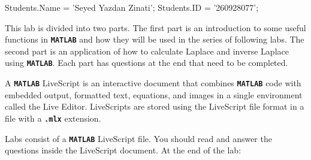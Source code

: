 \documentclass{article}
\begin{document}

\begin{matlabcode}
Students.Name = 'Seyed Yazdan Zinati';
Students.ID = '260928077';
\end{matlabcode}



\begin{par}
\begin{flushleft}
This lab is divided into two parts. The first part is an introduction to some useful functions in \texttt{\textbf{MATLAB}} and how they will be used in the series of following labs. The second part is an application of how to calculate Laplace and inverse Laplace using \texttt{\textbf{MATLAB}}. Each part has questions at the end that need to be completed.
\end{flushleft}
\end{par}


\begin{par}
\begin{flushleft}
A \texttt{\textbf{MATLAB}} LiveScript is an interactive document that combines \texttt{\textbf{MATLAB}} code with embedded output, formatted text, equations, and images in a single environment called the Live Editor. LiveScripts are stored using the LiveScript file format in a file with a \texttt{\textbf{.mlx}} extension.
\end{flushleft}
\end{par}

\begin{par}
\begin{flushleft}
Labs consist of a \texttt{\textbf{MATLAB}} LiveScript file. You should read and answer the questions inside the LiveScript document. At the end of the lab:
\end{flushleft}
\end{par}
\end{document}

